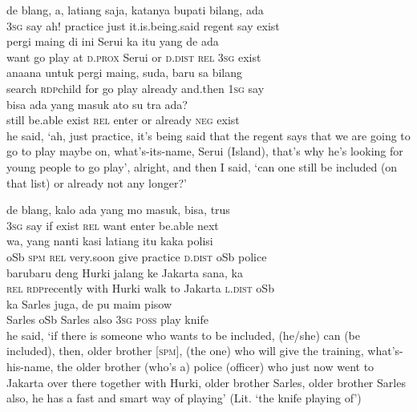\ea
\gll   de    {blang,}    {a,}    {latiang}    {saja,}    {katanya}    {bupati}    {bilang,}   ada\\
  \textsc{3sg}    {say}    {ah!}    {practice}    {just}    {it.is.being.said}    {regent}    {say}   exist\\
    {pergi}    {maing}    {di}    {ini}    {Serui}    {ka}    {itu}    {yang}    {de}    {ada}\\
   {want}    {go}    {play}    {at}    {\textsc{d.prox}}    {Serui}    {or}    {\textsc{d.dist}}    {\textsc{rel}}    {\textsc{3sg}}    {exist}\\
    {ana{\Tilde}ana}    {untuk}    {pergi}    {maing,}    {suda,}    {baru}    {sa}    {bilang}\\
   {search}    {\textsc{rdp}{\Tilde}child}    {for}    {go}    {play}    {already}    {and.then}    {\textsc{1sg}}    {say}\\
    {bisa}    {ada}    {yang}    {masuk}    {ato}    {su}    {tra}    {ada?}\\
   {still}    {be.able}    {exist}    {\textsc{rel}}    {enter}    {or}    {already}    {\textsc{neg}}    {exist}\\
\glt
he said, ‘ah, just practice, it’s being said that the regent says that we are going to go to play maybe on, what’s-its-name, Serui (Island), that’s why he’s looking for young people to go play’, alright, and then I said, ‘can one still be included (on that list) or already not any longer?’
\z

\ea
\gll   de    {blang,}    {kalo}    {ada}    {yang}    {mo}    {masuk,}    {bisa,}    {trus}\\
  \textsc{3sg}    {say}    {if}    {exist}    {\textsc{rel}}    {want}    {enter}    {be.able}    {next}\\
    {wa,}    {yang}    {nanti}    {kasi}    {latiang}    {itu}    {kaka}   polisi\\
   {oSb}    {\textsc{spm}}    {\textsc{rel}}    {very.soon}    {give}    {practice}    {\textsc{d.dist}}    {oSb}   police\\
    {baru{\Tilde}baru}    {deng}    {Hurki}    {jalang}    {ke}    {Jakarta}    {sana,}    {ka}\\
   {\textsc{rel}}    {\textsc{rdp}{\Tilde}recently}    {with}    {Hurki}    {walk}    {to}    {Jakarta}    {\textsc{l.dist}}    {oSb}\\
    {ka}    {Sarles}    {juga,}    {de}    {pu}    {maim}    {pisow}\\
   {Sarles}    {oSb}    {Sarles}    {also}    {\textsc{3sg}}    {\textsc{poss}}    {play}    {knife}\\
\glt
he said, ‘if there is someone who wants to be included, (he/she) can (be included), then, older brother [\textsc{spm}], (the one) who will give the training, what’s-his-name, the older brother (who’s a) police (officer) who just now went to Jakarta over there together with Hurki, older brother Sarles, older brother Sarles also, he has a fast and smart way of playing’ (Lit. ‘the knife playing of’)
\z

